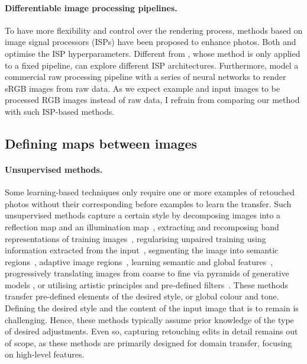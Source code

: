 \paragraph{Differentiable image processing pipelines.} To have more flexibility and control over the rendering process, methods based on image signal processors (\gls{ISP}s) have been proposed to enhance photos. Both \citeauthor{tseng2019hyperparameter}\cite{tseng2019hyperparameter} and \citeauthor{yu2021reconfigisp}\cite{yu2021reconfigisp}optimise the \gls{ISP} hyperparameters. Different from \citeauthor{tseng2019hyperparameter} \cite{tseng2019hyperparameter}, whose method is only applied to a fixed pipeline, \citeauthor{yu2021reconfigisp} \cite{yu2021reconfigisp} can explore different \gls{ISP} architectures. Furthermore, \citeauthor{tseng2022neural} \cite{tseng2022neural} model a commercial raw processing pipeline with a series of neural networks to render \gls{sRGB} images from raw data. As we expect example and input images to be processed RGB images instead of raw data, I refrain from comparing our method with such \gls{ISP}-based methods.

\subsection{Defining maps between images}

\paragraph{Unsupervised methods.} Some learning-based techniques only require one or more examples of retouched photos without their corresponding before examples to learn the transfer. Such unsupervised methods capture a certain style by decomposing images into a reflection map and an illumination map~\cite{ma2021retinexgan}, extracting and recomposing band representations of training images~\cite{yang2020fidelity}, regularising unpaired training using information extracted from the input~\cite{9334429}, segmenting the image into semantic regions~\cite{Liu16Makeup}, adaptive image regions~\cite{Frigo16Split}, learning semantic and global features~\cite{Chen18Deep}, progressively translating images from coarse to fine via pyramids of generative models \cite{lin2020tuigan}, or utilising artistic principles and pre-defined filters~\cite{Zhang13Style,Hu18Exposure}. These methods transfer pre-defined elements of the desired style, or global colour and tone. Defining the desired style and the content of the input image that is to remain is challenging. Hence, these methods typically assume prior knowledge of the type of desired adjustments. Even so, capturing retouching edits in detail remains out of scope, as these methods are primarily designed for domain transfer, focusing on high-level features.

